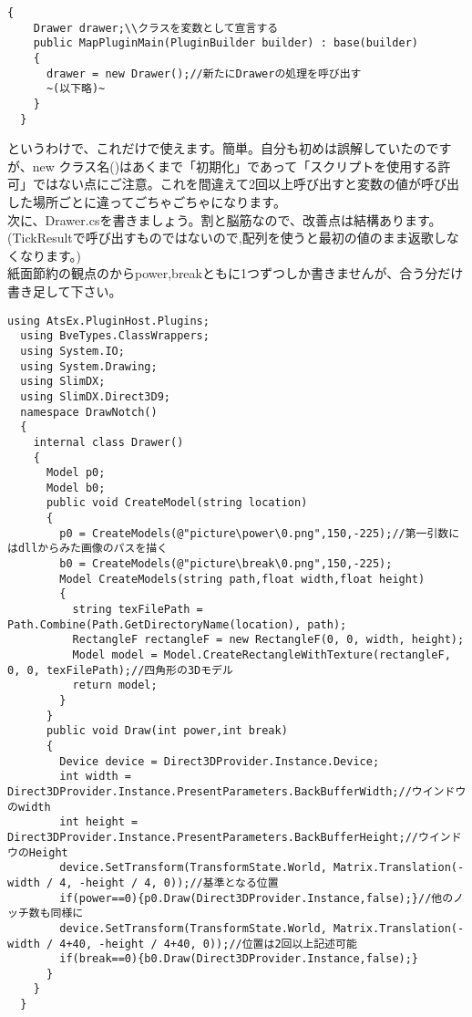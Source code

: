 \documentclass[b5paper,9pt,platex,dvipdfmx]{jsarticle}
\begin{document}
\begin{multicols*}{3}
\begin{lstlisting}[caption = クラス直下～PluginMain]
  {
    Drawer drawer;\\クラスを変数として宣言する
    public MapPluginMain(PluginBuilder builder) : base(builder)
    {
      drawer = new Drawer();//新たにDrawerの処理を呼び出す
      ~(以下略)~
    }
  }
\end{lstlisting}
というわけで、これだけで使えます。簡単。自分も初めは誤解していたのですが、new クラス名()はあくまで「初期化」であって「スクリプトを使用する許可」ではない点にご注意。これを間違えて2回以上呼び出すと変数の値が呼び出した場所ごとに違ってごちゃごちゃになります。\\
次に、Drawer.csを書きましょう。割と脳筋なので、改善点は結構あります。(TickResultで呼び出すものではないので,配列を使うと最初の値のまま返歌しなくなります。)\\
紙面節約の観点のからpower,breakともに1つずつしか書きませんが、合う分だけ書き足して下さい。\\
\begin{lstlisting}[caption = Drawer.cs]
  using AtsEx.PluginHost.Plugins;
  using BveTypes.ClassWrappers;
  using System.IO;
  using System.Drawing;
  using SlimDX;
  using SlimDX.Direct3D9;
  namespace DrawNotch()
  {
    internal class Drawer()
    {
      Model p0;
      Model b0;
      public void CreateModel(string location)
      {
        p0 = CreateModels(@"picture\power\0.png",150,-225);//第一引数にはdllからみた画像のパスを描く
        b0 = CreateModels(@"picture\break\0.png",150,-225);
        Model CreateModels(string path,float width,float height)
        {
          string texFilePath = Path.Combine(Path.GetDirectoryName(location), path);
          RectangleF rectangleF = new RectangleF(0, 0, width, height);
          Model model = Model.CreateRectangleWithTexture(rectangleF, 0, 0, texFilePath);//四角形の3Dモデル
          return model;
        }
      }
      public void Draw(int power,int break)
      {
        Device device = Direct3DProvider.Instance.Device;
        int width = Direct3DProvider.Instance.PresentParameters.BackBufferWidth;//ウインドウのwidth
        int height = Direct3DProvider.Instance.PresentParameters.BackBufferHeight;//ウインドウのHeight
        device.SetTransform(TransformState.World, Matrix.Translation(-width / 4, -height / 4, 0));//基準となる位置
        if(power==0){p0.Draw(Direct3DProvider.Instance,false);}//他のノッチ数も同様に
        device.SetTransform(TransformState.World, Matrix.Translation(-width / 4+40, -height / 4+40, 0));//位置は2回以上記述可能
        if(break==0){b0.Draw(Direct3DProvider.Instance,false);}
      }
    }
  }
\end{lstlisting}

\end{multicols*}
\end{document}
